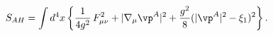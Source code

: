\begin{equation}
\label{ah2fl}
S_{AH}=\int d^4x\left\{\frac1{4g^2}\,F^2_{\mu\nu}+|\nabla_\mu
\vp^A|^2+\frac{g^2}{8}(|\vp^A|^2-\xi_1)^2\right\}.
\end{equation}

